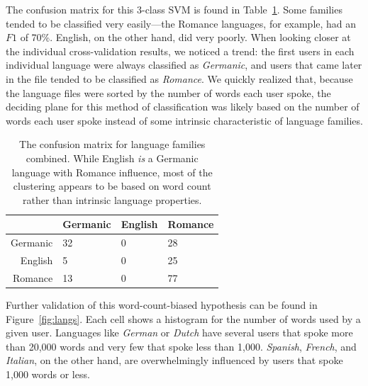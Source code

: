 \documentclass[11pt]{article}
\begin{document}
The confusion matrix for this 3-class SVM is found in Table~\ref{tab:top-3}.  Some families tended to be classified very easily---the Romance languages, for example, had an $F1$ of 70\%.  English, on the other hand, did very poorly.  When looking closer at the individual cross-validation results, we noticed a trend:  the first users in each individual language were always classified as {\it Germanic}, and users that came later in the file tended to be classified as {\it Romance}.  We quickly realized that, because the language files were sorted by the number of words each user spoke, the deciding plane for this method of classification was likely based on the number of words each user spoke instead of some intrinsic characteristic of language families.

\begin{table}[t]
\caption{The confusion matrix for language families combined.  While English 
{\it is} a Germanic language with Romance influence, most of the clustering appears to be based on word count rather than intrinsic language properties.}\label{tab:top-3}
\begin{tabular}{r|lll}
& Germanic & English & Romance\\\hline
Germanic & 32 & 0 & 28\\
English & 5 & 0 & 25\\
Romance & 13 & 0 & 77
\end{tabular}
\end{table}  

Further validation of this word-count-biased hypothesis can be found in Figure~\ref{fig:langs}.  Each cell shows a histogram for the number of words used by a given user.  Languages like {\it German} or {\it Dutch} have several users that spoke more than 20,000 words and very few that spoke less than 1,000.  {\it Spanish}, {\it French}, and {\it Italian}, on the other hand, are overwhelmingly influenced by users that spoke 1,000 words or less.
\end{document}
